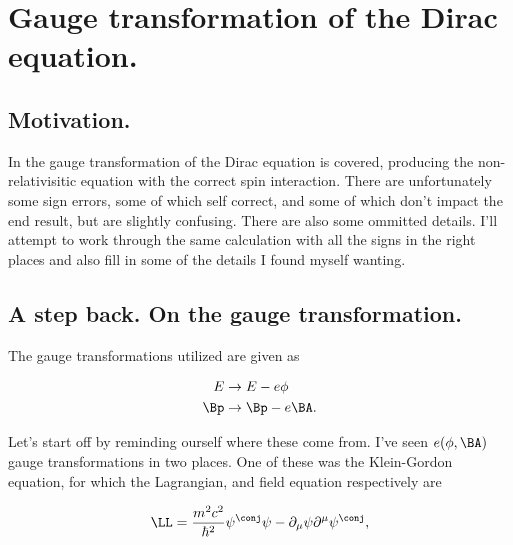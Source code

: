 
%

\chapter{Gauge transformation of the Dirac equation.}
\label{chap:diracGauge}
{}
\date{Aug 4, 2011}

\beginArtWithToc

\section{Motivation.}

In \cite{desai2009quantum} the gauge transformation of the Dirac equation is covered, producing the non-relativisitic equation with the correct spin interaction.  There are unfortunately some sign errors, some of which self correct, and some of which don't impact the end result, but are slightly confusing.  There are also some ommitted details.  I'll attempt to work through the same calculation with all the signs in the right places and also fill in some of the details I found myself wanting.

\section{A step back.  On the gauge transformation.}

The gauge transformations utilized are given as

\begin{align}\label{eqn:diracGauge:n}
E &\rightarrow E - e \phi \\
\Bp &\rightarrow \Bp - e \BA.
\end{align}

Let's start off by reminding ourself where these come from.  I've seen $e(\phi,\BA)$ gauge transformations in two places.  One of these was the Klein-Gordon equation, for which the Lagrangian, and field equation respectively are

\begin{equation}\label{eqn:diracGauge:n}
\LL = \frac{m^2 c^2}{\hbar^2} \psi^\conj \psi - \partial_\mu \psi \partial^\mu \psi^\conj,
\end{equation}

\begin{equation}\label{eqn:diracGauge:n}
\end{equation}

\EndArticle
